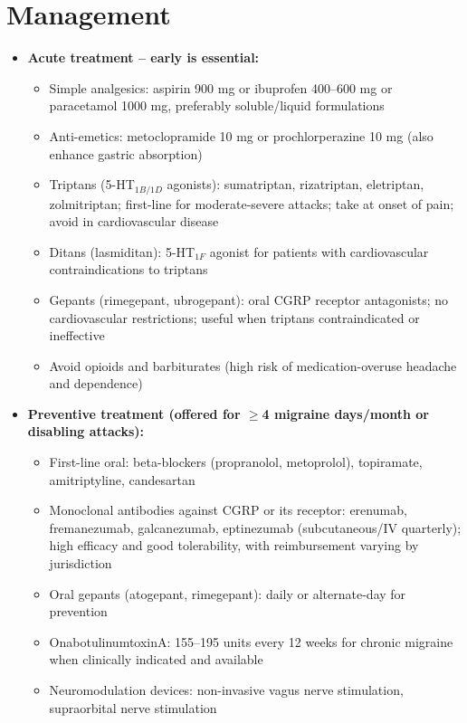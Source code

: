 \section*{Management}
\begin{itemize}
    \item \textbf{Acute treatment -- early is essential:}
    \begin{itemize}
        \item Simple analgesics: aspirin 900 mg or ibuprofen 400--600 mg or paracetamol 1000 mg, preferably soluble/liquid formulations
        \item Anti-emetics: metoclopramide 10 mg or prochlorperazine 10 mg (also enhance gastric absorption)
        \item Triptans (5-HT$_{1B/1D}$ agonists): sumatriptan, rizatriptan, eletriptan, zolmitriptan; first-line for moderate-severe attacks; take at onset of pain; avoid in cardiovascular disease
        \item Ditans (lasmiditan): 5-HT$_{1F}$ agonist for patients with cardiovascular contraindications to triptans
        \item Gepants (rimegepant, ubrogepant): oral CGRP receptor antagonists; no cardiovascular restrictions; useful when triptans contraindicated or ineffective
        \item Avoid opioids and barbiturates (high risk of medication-overuse headache and dependence)
    \end{itemize}
    \item \textbf{Preventive treatment (offered for $\ge$4 migraine days/month or disabling attacks):}
    \begin{itemize}
        \item First-line oral: beta-blockers (propranolol, metoprolol), topiramate, amitriptyline, candesartan
        \item Monoclonal antibodies against CGRP or its receptor: erenumab, fremanezumab, galcanezumab, eptinezumab (subcutaneous/IV quarterly); high efficacy and good tolerability, with reimbursement varying by jurisdiction
        \item Oral gepants (atogepant, rimegepant): daily or alternate-day for prevention
        \item OnabotulinumtoxinA: 155--195 units every 12 weeks for chronic migraine when clinically indicated and available
        \item Neuromodulation devices: non-invasive vagus nerve stimulation, supraorbital nerve stimulation
    \end{itemize}

\end{itemize}
